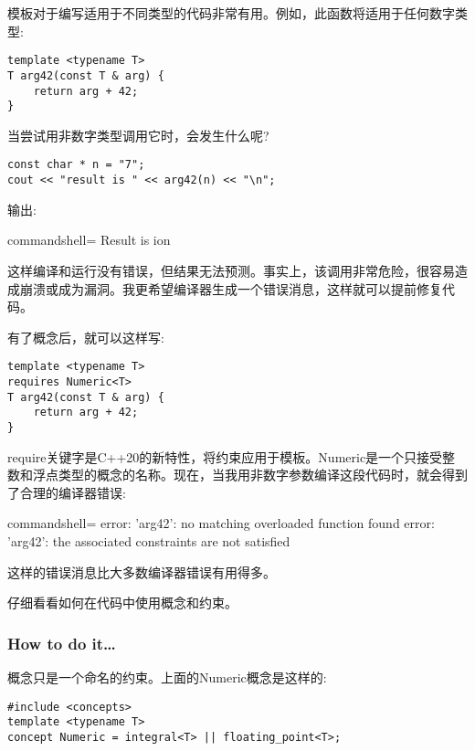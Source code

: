 
模板对于编写适用于不同类型的代码非常有用。例如，此函数将适用于任何数字类型:

\begin{lstlisting}[style=styleCXX]
template <typename T>
T arg42(const T & arg) {
	return arg + 42;
}
\end{lstlisting}

当尝试用非数字类型调用它时，会发生什么呢?

\begin{lstlisting}[style=styleCXX]
const char * n = "7";
cout << "result is " << arg42(n) << "\n";
\end{lstlisting}

输出:

\begin{tcblisting}{commandshell={}}
Result is ion
\end{tcblisting}

这样编译和运行没有错误，但结果无法预测。事实上，该调用非常危险，很容易造成崩溃或成为漏洞。我更希望编译器生成一个错误消息，这样就可以提前修复代码。

有了概念后，就可以这样写:

\begin{lstlisting}[style=styleCXX]
template <typename T>
requires Numeric<T>
T arg42(const T & arg) {
	return arg + 42;
}
\end{lstlisting}

require关键字是C++20的新特性，将约束应用于模板。Numeric是一个只接受整数和浮点类型的概念的名称。现在，当我用非数字参数编译这段代码时，就会得到了合理的编译器错误:

\begin{tcblisting}{commandshell={}}
error: 'arg42': no matching overloaded function found
error: 'arg42': the associated constraints are not satisfied
\end{tcblisting}

这样的错误消息比大多数编译器错误有用得多。

仔细看看如何在代码中使用概念和约束。


\subsubsection{How to do it…}

概念只是一个命名的约束。上面的Numeric概念是这样的:

\begin{lstlisting}[style=styleCXX]
#include <concepts>
template <typename T>
concept Numeric = integral<T> || floating_point<T>;
\end{lstlisting}

